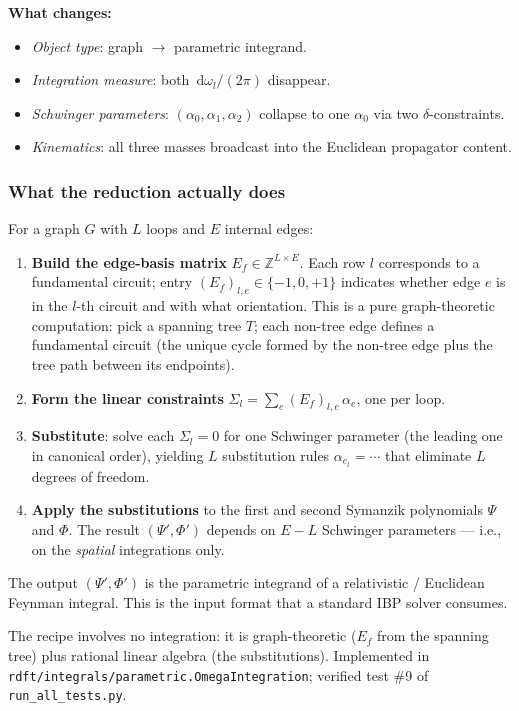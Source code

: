 \documentclass[11pt,a4paper]{article}
\renewcommand{\dd}[1]{\,\mathrm{d}#1}
\theoremstyle{definition}
\theoremstyle{plain}
\begin{document}
\begin{cfacbox}
\textbf{What changes:}
\begin{itemize}[leftmargin=2em, itemsep=0pt]
  \item \emph{Object type}: graph $\to$ parametric integrand.
  \item \emph{Integration measure}: both $\dd\omega_l/(2\pi)$ disappear.
  \item \emph{Schwinger parameters}: $(\alpha_0, \alpha_1, \alpha_2)$
    collapse to one $\alpha_0$ via two $\delta$-constraints.
  \item \emph{Kinematics}: all three masses broadcast into the
    Euclidean propagator content.
\end{itemize}
\end{cfacbox}

\subsubsection{What the reduction actually does}

\begin{cfacbox}
For a graph $G$ with $L$ loops and $E$ internal edges:
\begin{enumerate}[leftmargin=2em]
  \item \textbf{Build the edge-basis matrix} $E_f \in \mathbb{Z}^{L
    \times E}$.  Each row $l$ corresponds to a fundamental circuit;
    entry $(E_f)_{l, e} \in \{-1, 0, +1\}$ indicates whether edge $e$
    is in the $l$-th circuit and with what orientation.  This is a
    pure graph-theoretic computation: pick a spanning tree $T$; each
    non-tree edge defines a fundamental circuit (the unique cycle
    formed by the non-tree edge plus the tree path between its
    endpoints).
  \item \textbf{Form the linear constraints}
    $\Sigma_l = \sum_e (E_f)_{l,e}\, \alpha_e$, one per loop.
  \item \textbf{Substitute}: solve each $\Sigma_l = 0$ for one
    Schwinger parameter (the leading one in canonical order),
    yielding $L$ substitution rules $\alpha_{e_l} = \cdots$ that
    eliminate $L$ degrees of freedom.
  \item \textbf{Apply the substitutions} to the first and second
    Symanzik polynomials $\Psi$ and $\Phi$.  The result $(\Psi', \Phi')$
    depends on $E - L$ Schwinger parameters --- i.e., on the
    \emph{spatial} integrations only.
\end{enumerate}

The output $(\Psi', \Phi')$ is the parametric integrand of a
relativistic / Euclidean Feynman integral.  This is the input format
that a standard IBP solver consumes.

The recipe involves no integration: it is graph-theoretic
($E_f$ from the spanning tree) plus rational linear algebra (the
substitutions).  Implemented in
\texttt{rdft/integrals/parametric.OmegaIntegration}; verified test
\#9 of \texttt{run\_all\_tests.py}.
\end{cfacbox}
\end{document}
